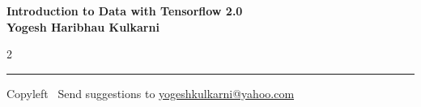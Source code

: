 \documentclass[8pt,landscape]{article}
\begin{document}
\footnotesize


\begin{center}
\Large{\textbf{Introduction to Data with Tensorflow 2.0\\ Yogesh Haribhau Kulkarni}}  
\end{center}

\begin{multicols}{2}

\end{multicols}

\rule{\linewidth}{0.25pt}
\scriptsize
Copyleft \textcopyleft\  Send suggestions to 
\href{http://yati.io}{yogeshkulkarni@yahoo.com}
\end{document}
